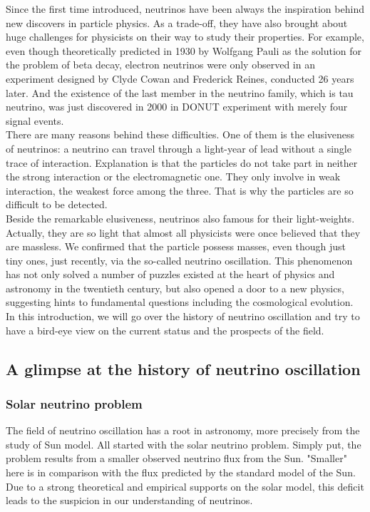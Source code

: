 
Since the first time introduced, neutrinos have been always the inspiration behind new discovers in particle physics. As a trade-off, they have also brought about huge challenges for physicists on their way to study their properties. For example, even though theoretically predicted in 1930 by Wolfgang Pauli as the solution for the problem of beta decay, electron neutrinos were only observed in an experiment designed by Clyde Cowan and Frederick Reines, conducted 26 years later. And the existence of the last member in the neutrino family, which is tau neutrino, was just discovered in 2000 in DONUT experiment with merely four signal events. \\

There are many reasons behind these difficulties. One of them is the elusiveness of neutrinos: a neutrino can travel through a light-year of lead without a single trace of interaction. Explanation is that the particles do not take part in neither the strong interaction or the electromagnetic one. They only involve in weak interaction, the weakest force among the three. That is why the particles are so difficult to be detected. \\

Beside the remarkable elusiveness, neutrinos also famous for their light-weights. Actually, they are so light that almost all physicists were once believed that they are massless. We confirmed that the particle possess masses, even though just tiny ones, just recently, via the so-called neutrino oscillation. This phenomenon has not only solved a number of puzzles existed at the heart of physics and astronomy in the twentieth century, but also opened a door to a new physics, suggesting hints to fundamental questions including the cosmological evolution. In this introduction, we will go over the history of neutrino oscillation and try to have a bird-eye view on the current status and the prospects of the field.\\

\subsection{A glimpse at the history of neutrino oscillation}
\subsubsection{Solar neutrino problem}
The field of neutrino oscillation has a root in astronomy, more precisely from the study of Sun model. All started with the solar neutrino problem. Simply put, the problem results from a smaller observed neutrino flux from the Sun. "Smaller" here is in comparison with the flux predicted by the standard model of the Sun. Due to a strong theoretical and empirical supports on the solar model, this deficit leads to the suspicion in our understanding of neutrinos. \\

